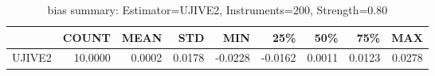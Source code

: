 \begin{table}[ht]
\centering
\caption{bias summary: Estimator=UJIVE2, Instruments=200, Strength=0.80}
\begin{tabular}{lrrrrrrrr}
\toprule
 & COUNT & MEAN & STD & MIN & 25\% & 50\% & 75\% & MAX \\
\midrule
UJIVE2 & 10.0000 & 0.0002 & 0.0178 & -0.0228 & -0.0162 & 0.0011 & 0.0123 & 0.0278 \\
\bottomrule
\end{tabular}
\end{table}
